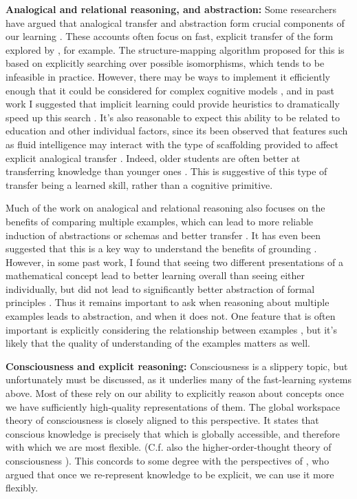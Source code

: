 \textbf{Analogical and relational reasoning, and abstraction:} Some researchers have argued that analogical transfer and abstraction form crucial components of our learning \citep[e.g.][]{Gentner2003, Lakoff1980, Gentner2017}. These accounts often focus on fast, explicit transfer of the form explored by \citet{Gick1980}, for example. The structure-mapping algorithm \citep{Falkenhainer1989} proposed for this is based on explicitly searching over possible isomorphisms, which tends to be infeasible in practice. However, there may be ways to implement it efficiently enough that it could be considered for complex cognitive models \citep{Forbus2017}, and in past work I suggested that implicit learning could provide heuristics to dramatically speed up this search \citep{Lampinen2017a}. It's also reasonable to expect this ability to be related to education and other individual factors, since its been observed that features such as fluid intelligence may interact with the type of scaffolding provided to affect explicit analogical transfer \citep{Kubricht2017}. Indeed, older students are often better at transferring knowledge than younger ones \citep[e.g.][]{Chen1999}. This is suggestive of this type of transfer being a learned skill, rather than a cognitive primitive. \par
Much of the work on analogical and relational reasoning also focuses on the benefits of comparing multiple examples, which can lead to more reliable induction of abstractions or schemas and better transfer \citep{Gick1980, Gentner2017}. It has even been suggested that this is a key way to understand the benefits of grounding \citep{Jamrozik2016}. However, in some past work, I found that seeing two different presentations of a mathematical concept lead to better learning overall than seeing either individually, but did not lead to significantly better abstraction of formal principles \citep{Lampinen2017b}. Thus it remains important to ask when reasoning about multiple examples leads to abstraction, and when it does not. One feature that is often important is explicitly considering the relationship between examples \citep{Gentner2017}, but it's likely that the quality of understanding of the examples matters as well. \par 
\textbf{Consciousness and explicit reasoning:} Consciousness is a slippery topic, but unfortunately must be discussed, as it underlies many of the fast-learning systems above. Most of these rely on our ability to explicitly reason about concepts once we have sufficiently high-quality representations of them. The global workspace theory of consciousness \citep{Baars2005, Dehaene2017} is closely aligned  to this perspective. It states that conscious knowledge is precisely that which is globally accessible, and therefore with which we are most flexible. (C.f. also the higher-order-thought theory of consciousness \citep{Rosenthal1990}). This concords to some degree with the perspectives of \citet{Karmiloff-Smith1986}, who argued that once we re-represent knowledge to be explicit, we can use it more flexibly. \par
